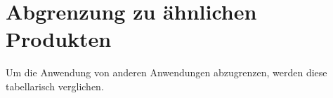 
\section{Abgrenzung zu ähnlichen Produkten}\label{sec:abgrenzung-zu-ahnlichen-produkten}
Um die Anwendung von anderen Anwendungen abzugrenzen, werden diese tabellarisch verglichen.

